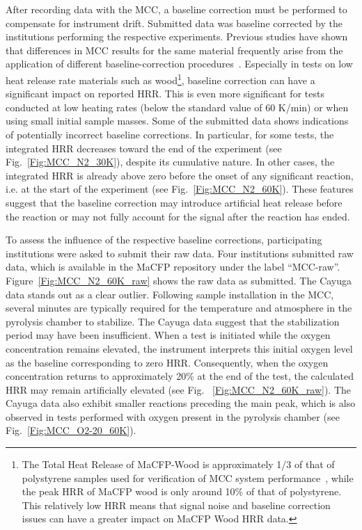 \documentclass{book}
\begin{document}
After recording data with the MCC, a baseline correction must be performed to compensate for instrument drift. Submitted data was baseline corrected by the institutions performing the respective experiments. Previous studies have shown that differences in MCC results for the same material frequently arise from the application of different baseline-correction procedures~\cite{walters2012microscale}. Especially in tests on low heat release rate materials such as wood\footnote{The Total Heat Release of MaCFP-Wood is approximately 1/3 of that of polystyrene samples used for verification of MCC system performance~\cite{lyon2013principles}, while the peak HRR of MaCFP wood is only around 10$\%$ of that of polystyrene. This relatively low HRR means that signal noise and baseline correction issues can have a greater impact on MaCFP Wood HRR data.}, baseline correction can have a significant impact on reported HRR. This is even more significant for tests conducted at low heating rates (below the standard value of 60 K/min) or when using small initial sample masses. Some of the submitted data shows indications of potentially incorrect baseline corrections. In particular, for some tests, the integrated HRR decreases toward the end of the experiment (see Fig.~\ref{Fig:MCC_N2_30K}), despite its cumulative nature. In other cases, the integrated HRR is already above zero before the onset of any significant reaction, i.e. at the start of the experiment (see Fig.~\ref{Fig:MCC_N2_60K}). These features suggest that the baseline correction may introduce artificial heat release before the reaction or may not fully account for the signal after the reaction has ended.

To assess the influence of the respective baseline corrections, participating institutions were asked to submit their raw data. Four institutions submitted raw data, which is available in the MaCFP repository under the label ``MCC-raw''. Figure~\ref{Fig:MCC_N2_60K_raw} shows the raw data as submitted. The Cayuga data stands out as a clear outlier. Following sample installation in the MCC, several minutes are typically required for the temperature and atmosphere in the pyrolysis chamber to stabilize. The Cayuga data suggest that the stabilization period may have been insufficient. When a test is initiated while the oxygen concentration remains elevated, the instrument interprets this initial oxygen level as the baseline corresponding to zero HRR. Consequently, when the oxygen concentration returns to approximately 20\% at the end of the test, the calculated HRR may remain artificially elevated (see Fig. ~\ref{Fig:MCC_N2_60K_raw}). The Cayuga data also exhibit smaller reactions preceding the main peak, which is also observed in tests performed with oxygen present in the pyrolysis chamber (see Fig.~\ref{Fig:MCC_O2-20_60K}).
\end{document}
